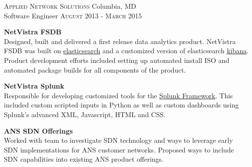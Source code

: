 
\textsc{Applied Network Solutions} \hfill Columbia, MD\\
Software Engineer \hfill \textsc{August 2013} - \textsc{March 2015}

\textbf{NetVistra FSDB}\\
Designed, built and delivered a first release data analytics product.  NetVistra
FSDB was built on \href{https://www.elastic.co/elasticsearch/}{elasticsearch} and a
customized version of elasticsearch
\href{https://www.elastic.co/kibana/}{kibana}.  Product
development efforts included setting up automated install ISO and automated 
package builds for all components of the product.

\textbf{NetVistra Splunk}\\
Responsible for developing customized tools for the \href{https://www.splunk.com}{Splunk Framework}.  This
included custom scripted inputs in Python as well as custom dashboards using
Splunk’s advanced XML, Javascript, HTML and CSS.

\textbf{ANS SDN Offerings}\\
Worked with team to investigate SDN technology and ways to leverage early SDN
implementations for ANS customer networks. Proposed ways to include SDN
capabilities into existing ANS product offerings.

